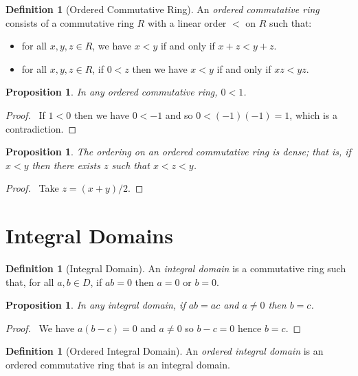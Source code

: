 \documentclass{book}
\let\qed\relax
\newtheorem{prop}[ax]{Proposition}
\theoremstyle{definition}
\newtheorem{df}[ax]{Definition}
\begin{document}
\begin{df}[Ordered Commutative Ring]
An \emph{ordered commutative ring} consists of a commutative ring $R$ with a linear order $<$ on $R$ such that:
\begin{itemize}
\item for all $x,y,z \in R$, we have $x < y$ if and only if $x + z < y + z$.
\item for all $x,y,z \in R$, if $0 < z$ then we have $x < y$ if and only if $xz < yz$.
\end{itemize}
\end{df}

\begin{prop}
In any ordered commutative ring, $0 < 1$.
\end{prop}

\begin{proof}
\pf\ If $1 < 0$ then we have $0 < -1$ and so $0 < (-1)(-1) = 1$, which is a contradiction. \qed
\end{proof}

\begin{prop}
The ordering on an ordered commutative ring is dense; that is, if $x < y$ then there exists $z$ such that $x < z < y$.
\end{prop}

\begin{proof}
\pf\ Take $z = (x + y) / 2$. \qed
\end{proof}

\section{Integral Domains}

\begin{df}[Integral Domain]
An \emph{integral domain} is a commutative ring such that, for all $a,b \in D$, if $ab = 0$ then $a = 0$ or $b = 0$.
\end{df}

\begin{prop}
\label{prop:multcancel}
In any integral domain, if $ab = ac$ and $a \neq 0$ then $b = c$.
\end{prop}

\begin{proof}
\pf\ We have $a(b-c) = 0$ and $a \neq 0$ so $b - c = 0$ hence $b = c$. \qed
\end{proof}

\begin{df}[Ordered Integral Domain]
An \emph{ordered integral domain} is an ordered commutative ring that is an integral domain.
\end{df}
\end{document}
